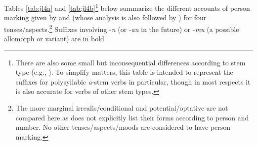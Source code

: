 \documentclass[output=paper]{langsci/langscibook}
\begin{document}
 Tables \ref{tab:jl4a} and \ref{tab:jl4b}\footnote{There are also some small but inconsequential differences according to stem type (e.g., \citealt[23‒27]{CainGair2000}). To simplify matters, this table is intended to represent the suffixes for polysyllabic \textit{a}-stem verbs in particular, though in most respects it is also accurate for verbs of other stem types.} 
  below summarize the different accounts of person marking given by \cite{Fritz2002} and \cite{CainGair2000} (whose analysis is also followed by \citealt{Maumoon2002}) for four tenses/aspects.\footnote{The more marginal irrealis/conditional and potential/optative are not compared here as \cite{Fritz2002} does not explicitly list their forms according to person and number. No other \mbox{tenses/aspects/moods} are considered to have person marking.} Suffixes involving -\textit{n} (or -\textit{an} in the future) or ‑\textit{mu} (a possible allomorph or variant) are in bold.
 

\begin{table}
\caption{Person suffixes according to \cite{Fritz2002}}
\label{tab:jl4a}	
\end{table}
\end{document}
